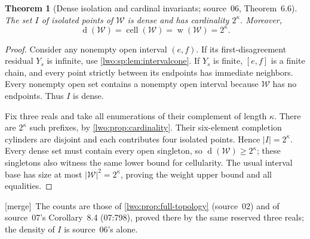 \documentclass[11pt,a4paper]{article}
\newtheorem{theorem}{Theorem}[section]
\theoremstyle{definition}
\theoremstyle{remark}
\newcommand{\W}{\mathcal W}
\newcommand{\dens}{\operatorname{d}}
\newcommand{\cell}{\operatorname{cell}}
\newcommand{\weight}{\operatorname{w}}
\newcommand{\merge}{\textsf{[merge]}}
\begin{document}
\begin{theorem}[Dense isolation and cardinal invariants; source~06, Theorem~6.6]
\label{lwo:sp:thm:denseisolated}
The set $I$ of isolated points of $\W$ is dense and has cardinality
$2^\kappa$. Moreover,
\[
 \dens(\W)=\cell(\W)=\weight(\W)=2^\kappa.
\]
\end{theorem}
\begin{proof}
Consider any nonempty open interval $(e,f)$. If its first-disagreement
residual $Y_s$ is infinite, use \cref{lwo:sp:lem:intervalcone}. If $Y_s$ is
finite, $[e,f]$ is a finite chain, and every point strictly between its
endpoints has immediate neighbors. Every nonempty open set contains a
nonempty open interval because $\W$ has no endpoints. Thus $I$ is dense.

Fix three reals and take all enumerations of their complement of length
$\kappa$. There are $2^\kappa$ such prefixes, by \cref{lwo:prop:cardinality}.
Their six-element completion cylinders are disjoint and each contributes four
isolated points. Hence $|I|=2^\kappa$. Every dense set must contain every
open singleton, so $\dens(\W)\geq2^\kappa$; these singletons also witness the
same lower bound for cellularity. The usual interval base has size at most
$|\W|^2=2^\kappa$, proving the weight upper bound and all equalities.
\end{proof}
\merge\ The counts are those of \cref{lwo:prop:full-topology} (source~02)
and of source~07's Corollary~8.4 (07:798), proved there by the same reserved
three reals; the density of $I$ is source~06's alone.
\end{document}
